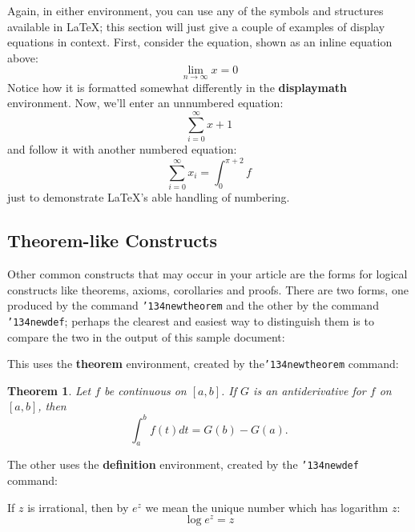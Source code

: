 \documentclass{nime-alternate}
\begin{document}
Again, in either environment, you can use any of the symbols
and structures available in \LaTeX; this section will just
give a couple of examples of display equations in context.
First, consider the equation, shown as an inline equation above:
\begin{equation}\lim_{n\rightarrow \infty}x=0\end{equation}
Notice how it is formatted somewhat differently in
the \textbf{displaymath}
environment.  Now, we'll enter an unnumbered equation:
\begin{displaymath}\sum_{i=0}^{\infty} x + 1\end{displaymath}
and follow it with another numbered equation:
\begin{equation}\sum_{i=0}^{\infty}x_i=\int_{0}^{\pi+2} f\end{equation}
just to demonstrate \LaTeX's able handling of numbering.



\subsection{Theorem-like Constructs}
Other common constructs that may occur in your article are
the forms for logical constructs like theorems, axioms,
corollaries and proofs.  There are
two forms, one produced by the
command \texttt{{\char'134}newtheorem} and the
other by the command \texttt{{\char'134}newdef}; perhaps
the clearest and easiest way to distinguish them is
to compare the two in the output of this sample document:

This uses the \textbf{theorem} environment, created by
the\linebreak\texttt{{\char'134}newtheorem} command:
\newtheorem{theorem}{Theorem}
\begin{theorem}
Let $f$ be continuous on $[a,b]$.  If $G$ is
an antiderivative for $f$ on $[a,b]$, then
\begin{displaymath}\int^b_af(t)dt = G(b) - G(a).\end{displaymath}
\end{theorem}

The other uses the \textbf{definition} environment, created
by the \texttt{{\char'134}newdef} command:
\begin{definition}
If $z$ is irrational, then by $e^z$ we mean the
unique number which has
logarithm $z$: \begin{displaymath}{\log e^z = z}\end{displaymath}
\end{definition}
\end{document}
